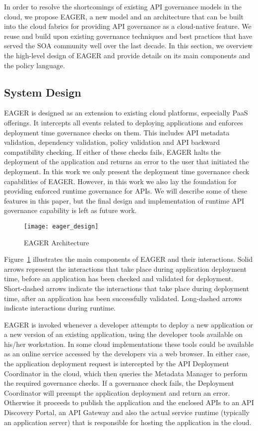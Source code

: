 In order to resolve the shortcomings of existing API governance models in the cloud, we propose EAGER, a new model and an architecture
that can be built into the cloud fabrics for providing API governance as a cloud-native feature. We reuse and build upon existing governance
techniques and best practices that have served the SOA community well over the last decade. In this section, we overview the high-level
design of EAGER and provide details on its main components and the policy language.

\subsection{System Design}
EAGER is designed as an extension to existing cloud platforms, especially PaaS offerings. It intercepts all events related to deploying applications
and enforces deployment time governance checks on them. This includes API metadata validation, dependency validation, policy validation and 
API backward compatibility
checking. If either of these checks fails, EAGER halts the deployment of the application and returns an error to the user that initiated the deployment.
In this work we only present the deployment time governance check capabilities of EAGER. However, in this work we also lay the foundation for
providing enforced runtime governance for APIs. We will describe some of these features in this paper, but the final design and implementation of
runtime API governance capability is left as future work.

\begin{figure}
\centering
\texttt{[image: eager\_design]}
\caption{EAGER Architecture}
\label{fig:eager_design}
\end{figure}

Figure~\ref{fig:eager_design} illustrates the main components of EAGER and their interactions. Solid arrows represent the interactions that take
place during application deployment time, before an application has been checked and validated for deployment. Short-dashed arrows indicate
the interactions that take place during deployment time, after an application has been successfully validated. Long-dashed arrows indicate
interactions during runtime.

EAGER is invoked whenever a developer attempts to deploy a new application or a new version of an existing application, using the developer
tools available on his/her workstation. In some cloud implementations these tools could be available as an online service accessed by the 
developers via a web browser. In either case, the application deployment request is intercepted by the API Deployment Coordinator in the cloud, which
then queries the Metadata Manager to perform the required governance checks. If a governance check fails, the Deployment Coordinator
will preempt the application deployment and return an error. Otherwise it proceeds to publish the application and the enclosed APIs to an
API Discovery Portal, an API Gateway and also the actual service runtime (typically an application server) that is responsible for hosting
the application in the cloud. 


